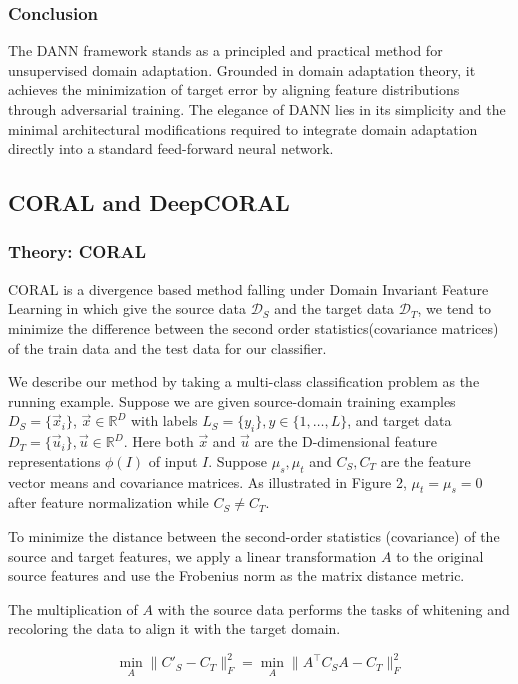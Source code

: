 \documentclass{article}
\begin{document}
\subsubsection{Conclusion}

The DANN framework stands as a principled and practical method for unsupervised domain adaptation. Grounded in domain adaptation theory, it achieves the minimization of target error by aligning feature distributions through adversarial training. The elegance of DANN lies in its simplicity and the minimal architectural modifications required to integrate domain adaptation directly into a standard feed-forward neural network.

\subsection{CORAL and DeepCORAL}
\subsubsection{Theory: CORAL}
CORAL is a divergence based method falling under Domain Invariant Feature Learning in which give the source data $\mathcal{D}_S$ and the target data $\mathcal{D}_T$, we tend to minimize the difference between the second order statistics(covariance matrices) of the train data and the test data for our classifier.

We describe our method by taking a multi-class classification problem as the running example. Suppose we are given source-domain training examples $D_S = \{\vec{x}_i\}$, $\vec{x} \in \mathbb{R}^D$ with labels $L_S = \{y_i\}, y \in \{1, \ldots, L\}$, and target data $D_T = \{\vec{u}_i\}, \vec{u} \in \mathbb{R}^D$. Here both $\vec{x}$ and $\vec{u}$ are the D-dimensional feature representations $\phi(I)$ of input $I$. Suppose $\mu_s, \mu_t$ and $C_S, C_T$ are the feature vector means and covariance matrices. As illustrated in Figure 2, $\mu_t = \mu_s = 0$ after feature normalization while $C_S \ne C_T$.

To minimize the distance between the second-order statistics (covariance) of the source and target features, we apply a linear transformation $A$ to the original source features and use the Frobenius norm as the matrix distance metric.

The multiplication of $A$ with the source data performs the tasks of whitening and recoloring the data to align it with the target domain.

\[
\min_A \|C'_S - C_T\|_F^2 = \min_A \|A^\top C_S A - C_T\|_F^2
\]
\end{document}
